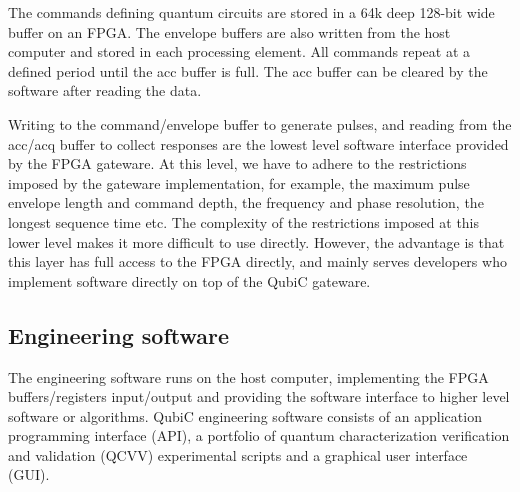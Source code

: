 \documentclass{ieeetran}
\begin{document}
The commands defining quantum circuits are stored in a 64k deep 128-bit wide buffer on an FPGA.
The envelope buffers are also written from the host computer and stored in each processing element. 
All commands repeat at a defined period until the acc buffer is full. 
The acc buffer can be cleared by the software after reading the data.


Writing to the command/envelope buffer to generate pulses, and reading from the acc/acq buffer to collect responses are the lowest level software interface provided by the FPGA gateware.
At this level, we have to adhere to the restrictions imposed by the gateware implementation, for example, the maximum pulse envelope length and command depth, the frequency and phase resolution, the longest sequence time etc.
The complexity of the restrictions imposed at this lower level makes it more difficult to use directly. 
However, the advantage is that this layer has full access to the FPGA directly, and mainly serves developers who implement software directly on top of the QubiC gateware. 

\subsection{Engineering software}
The engineering software runs on the host computer, implementing the FPGA buffers/registers input/output and providing the software interface to higher level software or algorithms. 
QubiC engineering software consists of an application programming interface (API), a portfolio of quantum characterization verification and validation (QCVV) experimental scripts and a graphical user interface (GUI). 
\end{document}
